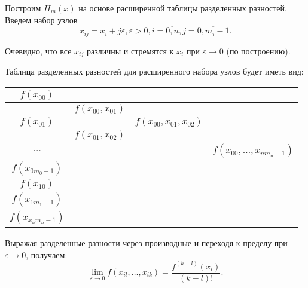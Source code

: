 Построим $H_m(x)$ на основе расширенной таблицы разделенных разностей. Введем набор узлов
\begin{equation*}
  x_{ij} = x_i + j \varepsilon, \varepsilon > 0, i = \overline{0, n}, j = \overline{0, m_i - 1}.
\end{equation*}

Очевидно, что все $x_{ij}$ различны и стремятся к $x_i$ при $\varepsilon \to 0$ (по построению).

Таблица разделенных разностей для расширенного набора узлов будет иметь вид:

\begin{center}
  \begin{tabular}{ | c | c | c | c |}
    \hline
    $f(x_{00})$          &                       &              &                \\ \hline
                        & $f(x_{00}, x_{01})   $ &              &                \\ \hline
    $f(x_{01})$          &                       &$f(x_{00}, x_{01}, x_{02})   $ &                  \\ \hline
                        & $f(x_{01}, x_{02} )  $ &              &                \\ \hline
    $\ldots$            &                 &               &  $f(x_{00}, \ldots, x_{n m_n - 1})   $  \\ \hline
    $f(x_{0 m_0-1})$     &       &  &                   \\ \hline
    $f(x_{1 0})$         &  &               & \\ \hline
    $f(x_{1 m_1-1})$     &       &  &                   \\ \hline
    $f(x_{x_n m_n - 1})$ &  &               &                 \\
      \hline
  \end{tabular}
\end{center}

Выражая разделенные разности через производные и переходя к пределу при $\varepsilon \to 0$, получаем:
\begin{equation*}
  \lim\limits_{\varepsilon \to 0} f(x_{il}, \ldots, x_{ik}) = \dfrac{f^{(k-l)} (x_i)}{(k-l)!}.
\end{equation*}
